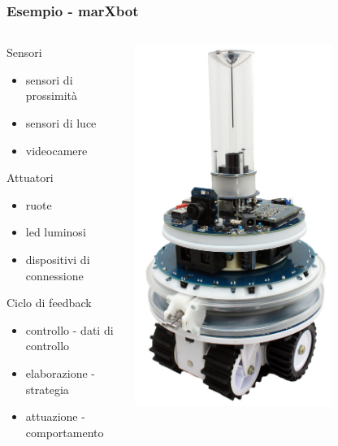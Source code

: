 \documentclass[10pt]{beamer}
\begin{document}
	\begin{frame}
		\frametitle{Esempio - marXbot}
		\begin{columns}
			\begin{column}{0.6\textwidth}
				Sensori
				\begin{itemize}
					\item sensori di prossimità
					\item sensori di luce
					\item videocamere
				\end{itemize}
				Attuatori
				\begin{itemize}
					\item ruote
					\item led luminosi
					\item dispositivi di connessione
				\end{itemize}
				Ciclo di feedback
				\begin{itemize}
					\item controllo - \alert{dati di controllo}
					\item elaborazione - \alert{strategia}
					\item attuazione - \alert{comportamento}
				\end{itemize}
			\end{column}
			\begin{column}{0.4\textwidth}
				\includegraphics[width=0.7\textwidth]{Images/marxbot}
			\end{column}
		\end{columns}
	\end{frame}
\end{document}

